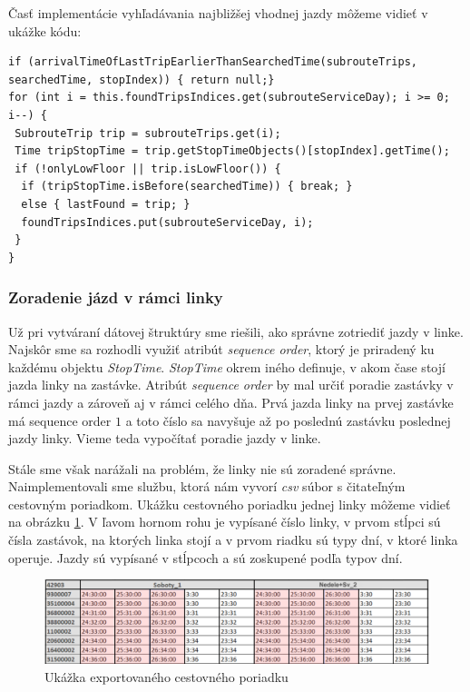 Časť implementácie vyhľadávania najbližšej vhodnej jazdy môžeme vidieť v ukážke kódu: 
\begin{lstlisting}
if (arrivalTimeOfLastTripEarlierThanSearchedTime(subrouteTrips, searchedTime, stopIndex)) { return null;}
for (int i = this.foundTripsIndices.get(subrouteServiceDay); i >= 0; i--) {
 SubrouteTrip trip = subrouteTrips.get(i);
 Time tripStopTime = trip.getStopTimeObjects()[stopIndex].getTime();
 if (!onlyLowFloor || trip.isLowFloor()) {
  if (tripStopTime.isBefore(searchedTime)) { break; }
  else { lastFound = trip; }
  foundTripsIndices.put(subrouteServiceDay, i);
 }
}
\end{lstlisting}

\subsubsection{Zoradenie jázd v rámci linky}
Už pri vytváraní dátovej štruktúry sme riešili, ako správne zotriediť jazdy v linke. Najskôr sme sa rozhodli využiť atribút \textit{sequence order}, ktorý je priradený ku každému objektu \textit{StopTime}. \textit{StopTime} okrem iného definuje, v akom čase stojí jazda linky na zastávke. Atribút \textit{sequence order} by mal určiť poradie zastávky v rámci jazdy a zároveň aj v rámci celého dňa. Prvá jazda linky na prvej zastávke má sequence order $1$ a toto číslo sa navyšuje až po poslednú zastávku poslednej jazdy linky. Vieme teda vypočítať poradie jazdy v linke. 

Stále sme však narážali na problém, že linky nie sú zoradené správne. Naimplementovali sme službu, ktorá nám vyvorí \textit{csv} súbor s čitateľným cestovným poriadkom. Ukážku cestovného poriadku jednej linky môžeme vidieť na obrázku \ref{fig:weird-times}. V ľavom hornom rohu je vypísané číslo linky, v prvom stĺpci sú čísla zastávok, na ktorých linka stojí a v prvom riadku sú typy dní, v ktoré linka operuje. Jazdy sú vypísané v stĺpcoch a sú zoskupené podľa typov dní. 

\begin{figure}[H]
\centerline{\includegraphics[width=1\textwidth]{images/weird-times}}
\caption[Ukážka exportovaného cestovného poriadku]{Ukážka exportovaného cestovného poriadku}
\label{fig:weird-times}
\end{figure} 


